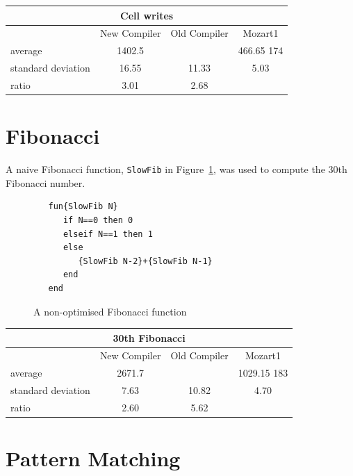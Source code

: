 \documentclass[a4paper]{memoir}
\begin{document}
\begin{appendices}
\begin{center}
\begin{tabular} {| l c c c|}
\hline
\multicolumn{4}{|c|}{\textbf{Cell writes}} \\ \hline
  & New Compiler& Old Compiler & Mozart1 \\
average&1402.5&&466.65  174 \\
standard deviation&16.55&11.33&5.03 \\
ratio&3.01& 2.68  & \\

\hline
\end{tabular}
\end{center}

\section{Fibonacci}

A naive Fibonacci function, \lstinline!SlowFib! in Figure~\ref{fig:perfs:slowfib}, was used to compute the 30th Fibonacci number. 

\begin{figure}[h]
\begin{lstlisting}
   fun{SlowFib N}
      if N==0 then 0
      elseif N==1 then 1
      else
         {SlowFib N-2}+{SlowFib N-1}
      end
   end
\end{lstlisting}
\caption{A non-optimised Fibonacci function}
\label{fig:perfs:slowfib}
\end{figure}


\begin{center}
\begin{tabular} {| l c c c|}
\hline
\multicolumn{4}{|c|}{\textbf{30th Fibonacci}} \\ \hline
  & New Compiler& Old Compiler & Mozart1 \\
average&2671.7&&1029.15 183 \\
standard deviation&7.63& 10.82&4.70 \\
ratio&2.60& 5.62  & \\

\hline
\end{tabular}
\end{center}

\section{Pattern Matching}


\end{appendices}
\end{document}
